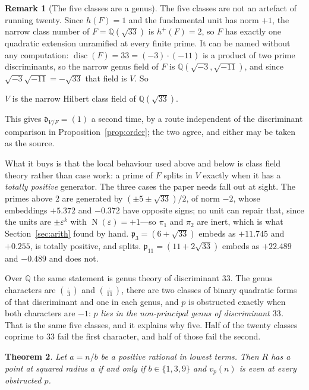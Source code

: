 \documentclass[11pt,reqno]{amsart}
\theoremstyle{plain}
\newtheorem{theorem}{Theorem}
\theoremstyle{definition}
\newtheorem{remark}[theorem]{Remark}
\newcommand{\Q}{\mathbb{Q}}
\newcommand{\Lat}{R}
\DeclareMathOperator{\Nm}{N}
\begin{document}
\begin{remark}[The five classes are a genus]\label{rem:narrow}
The five classes are not an artefact of running twenty. Since $h(F) = 1$ and the
fundamental unit has norm $+1$, the narrow class number of $F = \Q(\sqrt{33})$ is
$h^+(F) = 2$, so $F$ has exactly one quadratic extension unramified at every
finite prime. It can be named without any computation: $\operatorname{disc}(F) =
33 = (-3)\cdot(-11)$ is a product of two prime discriminants, so the narrow genus
field of $F$ is $\Q(\sqrt{-3},\sqrt{-11})$, and since $\sqrt{-3}\sqrt{-11} =
-\sqrt{33}$ that field is $V$. So

\begin{center}
$V$ is the narrow Hilbert class field of $\Q(\sqrt{33})$.
\end{center}

\noindent
This gives $\mathfrak d_{V/F} = (1)$ a second time, by a route independent of the
discriminant comparison in Proposition~\ref{prop:order}; the two agree, and
either may be taken as the source.

What it buys is that the local behaviour used above and below is class field
theory rather than case work: a prime of $F$ splits in $V$ exactly when it has a
\emph{totally positive} generator. The three cases the paper needs fall out at
sight. The primes above $2$ are generated by $(\pm5\pm\sqrt{33})/2$, of norm
$-2$, whose embeddings $+5.372$ and $-0.372$ have opposite signs; no unit can
repair that, since the units are $\pm\varepsilon^k$ with
$\Nm(\varepsilon) = +1$---so $\pi_1$ and $\pi_2$ are inert, which is what
Section~\ref{sec:arith} found by hand. $\mathfrak p_3 = (6+\sqrt{33})$ embeds as
$+11.745$ and $+0.255$, is totally positive, and splits.
$\mathfrak p_{11} = (11+2\sqrt{33})$ embeds as $+22.489$ and $-0.489$ and does
not.

Over $\Q$ the same statement is genus theory of discriminant $33$. The genus
characters are $(\tfrac{\cdot}{3})$ and $(\tfrac{\cdot}{11})$, there are two
classes of binary quadratic forms of that discriminant and one in each genus, and
$p$ is obstructed exactly when both characters are $-1$: \emph{$p$ lies in the
non-principal genus of discriminant $33$.} That is the same five classes, and it
explains why five. Half of the twenty classes coprime to $33$ fail the first
character, and half of those fail the second.
\end{remark}

\begin{theorem}\label{prop:shells}
Let $a = n/b$ be a positive rational in lowest terms. Then $\Lat$ has a point at
squared radius $a$ if and only if $b \in \{1,3,9\}$ and $v_p(n)$ is even at every
obstructed $p$.
\end{theorem}
\end{document}
